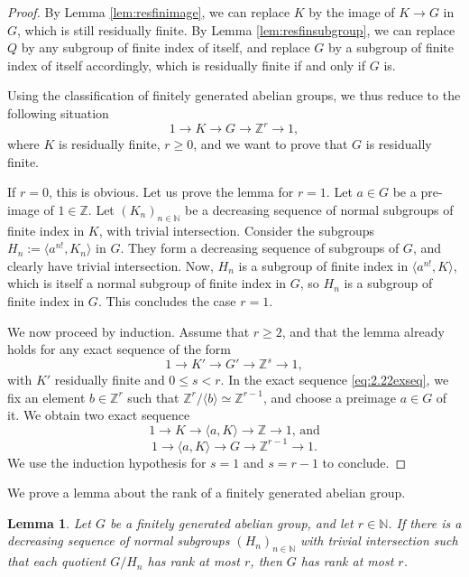\documentclass{amsart}
\newcommand{\zz}{\mathbb{Z}}
\newcommand{\nn}{\mathbb{N}}
\newtheorem{lemma}[theorem]{Lemma}
\theoremstyle{definition}
\theoremstyle{remark}
\numberwithin{equation}{section}
\begin{document}
\begin{proof}
By Lemma \ref{lem:resfinimage}, we can replace $K$ by the image of $K\to G$ in $G$, which is still residually finite. By Lemma \ref{lem:resfinsubgroup}, we can replace $Q$ by any subgroup of finite index of itself, and replace $G$ by a subgroup of finite index of itself accordingly, which is residually finite if and only if $G$ is.

Using the classification of finitely generated abelian groups, we thus reduce to the following situation
\begin{equation}\label{eq:2.22exseq}
   1\to K\to G\to \mathbb{Z}^r\to 1, 
\end{equation}
where $K$ is residually finite, $r\ge 0$, and we want to prove that $G$ is residually finite.

If $r=0$, this is obvious.
Let us prove the lemma for $r=1$.
Let $a\in G$ be a pre-image of $1\in\mathbb{Z}$. Let $(K_n)_{n\in \nn}$ be a decreasing sequence of normal subgroups of finite index in $K$, with trivial intersection. Consider the subgroups $H_n:=\langle a^{n!},K_n\rangle$ in $G$. They form a decreasing sequence of subgroups of $G$, and clearly have trivial intersection. Now, $H_n$ is a subgroup of finite index in $\langle a^{n!},K\rangle$, which is itself a normal subgroup of finite index in $G$, so $H_n$ is a subgroup of finite index in $G$. This concludes the case $r=1$.

We now proceed by induction. Assume that $r\ge 2$, and that the lemma already holds for any exact sequence of the form
$$1\to K'\to G'\to \zz^{s}\to 1,$$
with $K'$ residually finite and $0\le s < r$.
In the exact sequence \eqref{eq:2.22exseq}, we fix an element $b\in\zz^r$ such that $\zz^r/\langle b\rangle\simeq \zz^{r-1}$, and choose a preimage $a\in G$ of it. We obtain two exact sequence
$$1\to K\to \langle a, K\rangle \to\zz\to 1 \mbox{, and}$$
$$1\to \langle a, K\rangle \to G\to\zz^{r-1}\to 1.$$
We use the induction hypothesis for $s=1$ and $s=r-1$ to conclude.
\end{proof}


We prove a lemma about the rank of a finitely generated abelian group.

\begin{lemma}\label{lem:ab-group}
Let $G$ be a finitely generated abelian group, and let $r\in\nn$.
If there is a decreasing sequence of normal subgroups $(H_n)_{n\in \nn}$ with trivial intersection such that each quotient $G/H_n$ has rank at most $r$, then $G$ has rank at most $r$.
\end{lemma}
\end{document}
